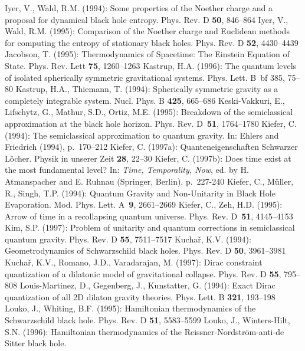 \documentclass[12pt]{article}
\begin{document}
\begin{thebibliography}{999}
%
\bibitem{}{}{}
Iyer, V., Wald, R.M. (1994): Some properties of the Noether charge
and a proposal for dynamical black hole entropy.
Phys. Rev. D {\bf 50}, 846--864
%
\bibitem{}{}{}
Iyer, V., Wald, R.M. (1995): Comparison of the Noether charge
and Euclidean methods for computing the entropy of stationary
black holes. Phys. Rev. D {\bf 52}, 4430--4439
% 
\bibitem{}{}{}
Jacobson, T. (1995): Thermodynamics of Spacetime: The Einstein
Equation of State. Phys. Rev. Lett {\bf 75}, 1260--1263
%
\bibitem{}{}{}
Kastrup, H.A. (1996): The quantum levels of isolated
spherically symmetric gravitational systems. Phys. Lett. B~{bf 385},
75--80
%
\bibitem{}{}{}
Kastrup, H.A., Thiemann, T. (1994): Spherically symmetric gravity
as a completely integrable system. Nucl. Phys. B {\bf 425}, 665--686
%
\bibitem{}{}{}
Keski-Vakkuri, E., Lifschytz, G., Mathur, S.D., Ortiz, M.E. (1995):
Breakdown of the semiclassical approximation at the black hole
horizon. Phys. Rev. D~{\bf 51}, 1764--1780
%
\bibitem{}{}{}
Kiefer, C. (1994): The semiclassical approximation to quantum gravity.
In: Ehlers and Friedrich (1994), p.~170--212
%
\bibitem{}{}{}
Kiefer, C. (1997a): Quanteneigenschaften Schwarzer L\"ocher.
Physik in unserer Zeit {\bf 28}, 22--30
%
\bibitem{}{}{}
Kiefer, C. (1997b): Does time exist at the most fundamental level?
In: {\it Time, Temporality, Now}, ed. by H. Atmanspacher
and E. Ruhnau (Springer, Berlin), p.~227-240
%
\bibitem{}{}{}
Kiefer, C., M\"uller, R., Singh, T.P. (1994): Quantum Gravity and
Non-Unitarity in Black Hole Evaporation. Mod. Phys. Lett. A~{\bf 9},
2661--2669
%
\bibitem{}{}{}
Kiefer, C., Zeh, H.D. (1995): Arrow of time in a recollapsing
quantum universe. Phys. Rev. D~{\bf 51}, 4145--4153
%
\bibitem{}{}{}
Kim, S.P. (1997): Problem of unitarity and quantum corrections in
semiclassical quantum gravity. Phys. Rev. D {\bf 55}, 7511--7517
%
\bibitem{}{}{}
Kucha\v{r}, K.V. (1994): Geometrodynamics of Schwarzschild
black holes. Phys. Rev. D {\bf 50}, 3961--3981
%
\bibitem{}{}{}
Kucha\v{r}, K.V., Romano, J.D., Varadarajan, M. (1997):
Dirac constraint quantization of a dilatonic model of
gravitational collapse. Phys. Rev. D {\bf 55}, 795--808
%
\bibitem{}{}{}
Louis-Martinez, D., Gegenberg, J., Kunstatter, G. (1994):
Exact Dirac quantization of all 2D dilaton gravity theories.
Phys. Lett. B {\bf 321}, 193--198
%
\bibitem{}{}{}
Louko, J., Whiting, B.F. (1995): Hamiltonian thermodynamics of the
Schwarzschild black hole. Phys. Rev. D {\bf 51}, 5583--5599
%
\bibitem{}{}{}
Louko, J., Winters-Hilt, S.N. (1996): Hamiltonian thermodynamics
of the Reissner-Nordstr\"om-anti-de Sitter black hole.

\end{thebibliography}
\end{document}
